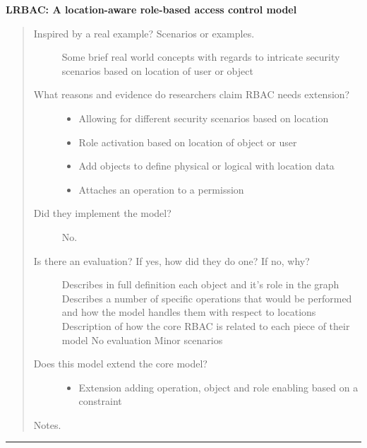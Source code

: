 \documentclass[letterpaper,10pt,english]{sphinxmanual}
\begin{document}
\textbf{LRBAC: A location-aware role-based access control model}
\begin{quote}
\begin{description}
\item[{Inspired by a real example? Scenarios or examples.}] \leavevmode
Some brief real world concepts with regards to intricate security scenarios based on location of user or object

\item[{What reasons and evidence do researchers claim RBAC needs extension?}] \leavevmode\begin{itemize}
\item {} 
Allowing for different security scenarios based on location

\item {} 
Role activation based on location of object or user

\item {} 
Add objects to define physical or logical with location data

\item {} 
Attaches an operation to a permission

\end{itemize}

\item[{Did they implement the model?}] \leavevmode
No.

\item[{Is there an evaluation? If yes, how did they do one? If no, why?}] \leavevmode
Describes in full definition each object and it's role in the graph
Describes a number of specific operations that would be performed and how the model handles them with respect to locations
Description of how the core RBAC is related to each piece of their model
No evaluation
Minor scenarios

\item[{Does this model extend the core model?}] \leavevmode\begin{itemize}
\item {} 
Extension adding operation, object and role enabling based on a constraint

\end{itemize}

\end{description}

Notes.
\end{quote}


\bigskip\hrule{}\bigskip
\end{document}
